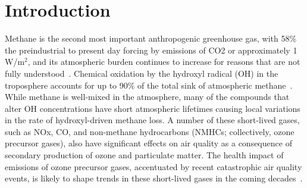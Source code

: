 \section{Introduction}



Methane is the second most important anthropogenic greenhouse gas, with 58\% the preindustrial to present day forcing by emissions of CO2 or approximately 1 W/m$^2$, and its atmospheric burden continues to increase for reasons that are not fully understood~\citep{ref:myhre2013}. Chemical oxidation by the hydroxyl radical (OH) in the troposphere accounts for up to 90\% of the total sink of atmospheric methane~\citep{ref:kirschke2013}. While methane is well-mixed in the atmosphere, many of the compounds that alter OH concentrations have short atmospheric lifetimes causing local variations in the rate of hydroxyl-driven methane loss. A number of these short-lived gases, such as NOx, CO, and non-methane hydrocarbons (NMHCs; collectively, ozone precursor gases), also have significant effects on air quality as a consequence of secondary production of ozone and particulate matter. The health impact of emissions of ozone precursor gases, accentuated by recent catastrophic air quality events, is likely to shape trends in these short-lived gases in the coming decades~\citep{ref:driscoll2015,ref:forouzanfar2015}.


